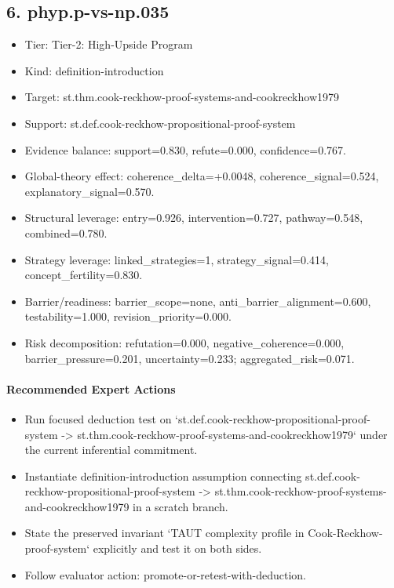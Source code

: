 \documentclass[11pt]{article}
\begin{document}
\subsection*{6. phyp.p-vs-np.035}
\begin{itemize}
\item Tier: Tier-2: High-Upside Program
\item Kind: definition-introduction
\item Target: st.thm.cook-reckhow-proof-systems-and-cookreckhow1979
\item Support: st.def.cook-reckhow-propositional-proof-system
\item Evidence balance: support=0.830, refute=0.000, confidence=0.767.
\item Global-theory effect: coherence\_delta=+0.0048, coherence\_signal=0.524, explanatory\_signal=0.570.
\item Structural leverage: entry=0.926, intervention=0.727, pathway=0.548, combined=0.780.
\item Strategy leverage: linked\_strategies=1, strategy\_signal=0.414, concept\_fertility=0.830.
\item Barrier/readiness: barrier\_scope=none, anti\_barrier\_alignment=0.600, testability=1.000, revision\_priority=0.000.
\item Risk decomposition: refutation=0.000, negative\_coherence=0.000, barrier\_pressure=0.201, uncertainty=0.233; aggregated\_risk=0.071.
\end{itemize}
\paragraph{Recommended Expert Actions}
\begin{itemize}
\item Run focused deduction test on `st.def.cook-reckhow-propositional-proof-system -> st.thm.cook-reckhow-proof-systems-and-cookreckhow1979` under the current inferential commitment.
\item Instantiate definition-introduction assumption connecting st.def.cook-reckhow-propositional-proof-system -> st.thm.cook-reckhow-proof-systems-and-cookreckhow1979 in a scratch branch.
\item State the preserved invariant `TAUT complexity profile in Cook-Reckhow-proof-system` explicitly and test it on both sides.
\item Follow evaluator action: promote-or-retest-with-deduction.
\end{itemize}
\end{document}
